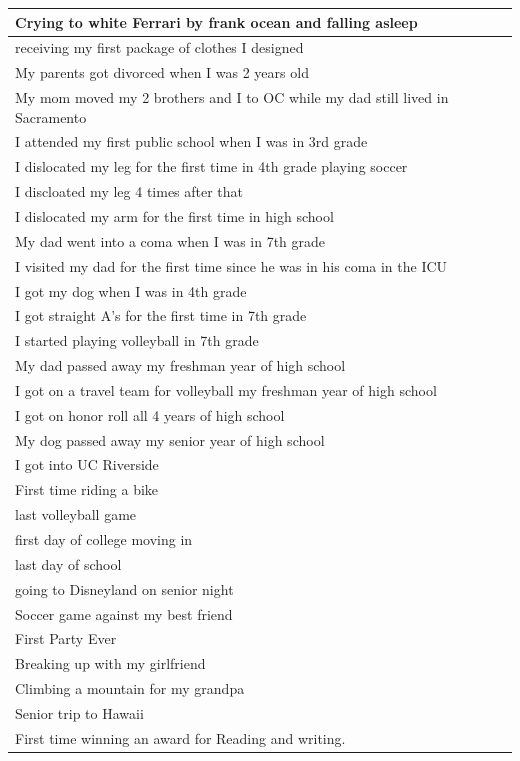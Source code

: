 \documentclass[
  .7em,
  letterpaper,
  DIV=11,
  numbers=noendperiod]{scrartcl}
\begin{document}
\begin{table}
\begin{tabular}{l}
\hline
Crying to white Ferrari by frank ocean and falling asleep\\
\hline
receiving my first package of clothes I designed\\
\hline
My parents got divorced when I was 2 years old\\
\hline
My mom moved my 2 brothers and I to OC while my dad still lived in Sacramento\\
\hline
I attended my first public school when I was in 3rd grade\\
\hline
I dislocated my leg for the first time in 4th grade playing soccer\\
\hline
I discloated my leg 4 times after that\\
\hline
I dislocated my arm for the first time in high school\\
\hline
My dad went into a coma when I was in 7th grade\\
\hline
I visited my dad for the first time since he was in his coma in the ICU\\
\hline
I got my dog when I was in 4th grade\\
\hline
I got straight A's for the first time in 7th grade\\
\hline
I started playing volleyball in 7th grade\\
\hline
My dad passed away my freshman year of high school\\
\hline
I got on a travel team for volleyball my freshman year of high school\\
\hline
I got on honor roll all 4 years of high school\\
\hline
My dog passed away my senior year of high school\\
\hline
I got into UC Riverside\\
\hline
First time riding a bike\\
\hline
last volleyball game\\
\hline
first day of college moving in\\
\hline
last day of school\\
\hline
going to Disneyland on senior night\\
\hline
Soccer game against my best friend\\
\hline
First Party Ever\\
\hline
Breaking up with my girlfriend\\
\hline
Climbing a mountain for my grandpa\\
\hline
Senior trip to Hawaii\\
\hline
First time winning an award for Reading and writing.\\

\end{tabular}
\end{table}
\end{document}

